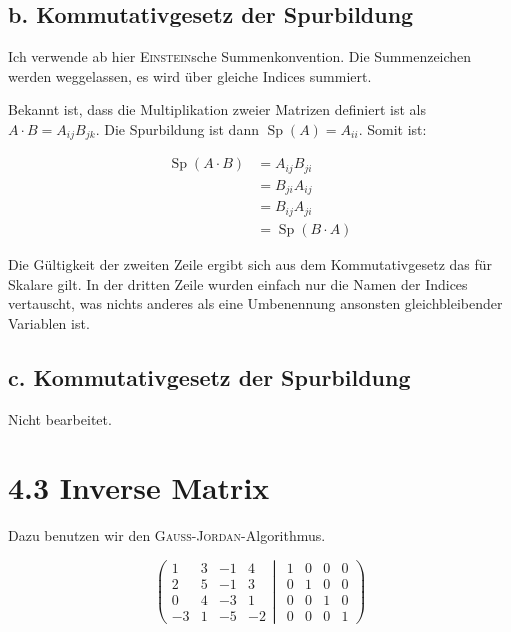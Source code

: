 \documentclass[a4paper,german,12pt,smallheadings]{scrartcl}
\begin{document}
\subsection*{b. Kommutativgesetz der Spurbildung}
Ich verwende ab hier \textsc{Einstein}sche Summenkonvention. Die Summenzeichen
werden weggelassen, es wird über gleiche Indices summiert.

Bekannt ist, dass die Multiplikation zweier Matrizen definiert ist als $A \cdot
B = A_{ij} B_{jk}$. Die Spurbildung ist dann $\operatorname{Sp}(A) = A_{ii}$.
Somit ist:

\begin{align*}
\operatorname{Sp}(A \cdot B) &=  A_{ij} B_{ji} \\
&= B_{ji} A_{ij} \\
&= B_{ij} A_{ji} \\
&= \operatorname{Sp}(B \cdot A)
\end{align*}

Die Gültigkeit der zweiten Zeile ergibt sich aus dem Kommutativgesetz das für
Skalare gilt. In der dritten Zeile wurden einfach nur die Namen der Indices
vertauscht, was nichts anderes als eine Umbenennung ansonsten gleichbleibender
Variablen ist.

\subsection*{c. Kommutativgesetz der Spurbildung}
Nicht bearbeitet.

\section*{4.3 Inverse Matrix}

Dazu benutzen wir den \textsc{Gauß}-\textsc{Jordan}-Algorithmus.

\begin{equation*}
\left(
 \begin{matrix}
 1 & 3 & -1 & 4 \\
 2 & 5 & -1 & 3 \\
 0 & 4 & -3 & 1 \\
 -3 & 1 & -5 & -2
 \end{matrix}
 \left|
  \hspace{5pt}
  \begin{matrix}
  1 & 0 & 0 & 0 \\
  0 & 1 & 0 & 0 \\
  0 & 0 & 1 & 0 \\
  0 & 0 & 0 & 1
  \end{matrix}
 \right)
\right.
\end{equation*}
\end{document}

